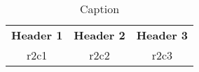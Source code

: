 \begin{table}[htb!]
  \caption{Caption}
  \label{table:label}
  \centering
  \begin{tabular}{ccc}
    \toprule
    \textbf{Header 1} & \textbf{Header 2} & \textbf{Header 3}\\
                 r2c1 &              r2c2 &              r2c3\\
    \toprule
  \end{tabular}
\end{table}
